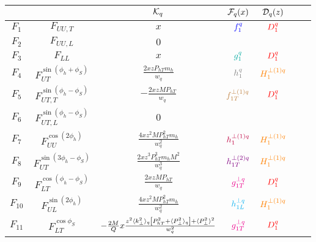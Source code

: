 \documentclass[floatfix,aps,prd,nofootinbib,superscriptaddress,preprint]{revtex4}
\newcommand\3[1]{\boldsymbol{#1}}
\newcommand{\Phperp}{P_{hT}}
\newcommand{\pperp}{P_\perp}
\newcommand{\avpperp}{\la \pperp^2 \ra}
\newcommand{\la}{\langle}
\newcommand{\ra}{\rangle}
\begin{document}
\begin{table}[h!]
\begin{tabular}{|c|c|c|c|c|c|c|}
\hline
         &                                     & ${\cal{K}}_q$                                                                               & ${\cal F}_q(x)$ & ${\cal D}_q(z)$ \\\hline
$F_1$    & $F_{UU,T}$                          & $x$                                                                                         & ${\color{blue} f_1^q}$          & ${\color{red} D_1^{q}} $          \\\hline
$F_2$    & $F_{UU,L}$                          & $0$                                                                                         &                 & \\\hline
$F_3$    & $F_{LL}$                            & $x$                                                                                         & $\ppdf$         & ${\color{red} D_1^{q}}$           \\\hline
$F_4$    & $F_{UT}^{\sin(\phi_h+\phi_S)}$      & $\frac{2 x z \Phperp  m_h}{w_q}$                                                            & $\transversity$ & ${\color{orange} H^{\perp(1)q}_{1} }$      \\\hline
$F_5$    & $F_{UT,T}^{\sin(\phi_h-\phi_S)}$    & $-\frac{2xzM \Phperp}{w_q}$                                                                 & ${\color{brown} f^{\perp(1)q}_{1T}}$       & ${\color{red} D_1^{q}}$           \\\hline
$F_6$    & $F_{UT,L}^{\sin(\phi_h-\phi_S)}$    & $0$                                                                                         &                 & \\\hline
$F_7$    & $F_{UU}^{\cos(2\phi_h)}$            & $\frac{4 x z^2 M \Phperp^2 m_h}{w_q^2} $                                                    & ${\color{purple} h^{\perp(1)q}_1 }$  & ${\color{orange} H^{\perp(1)q}_{1} } $     \\\hline
$F_8$    & $F_{UT}^{\sin(3\phi_h-\phi_S)}$     & $\frac{2 x z^3 \Phperp^3 m_h M^2}{w_q^3} $                                                 & ${\color{violet} h^{\perp(2)q}_{1T} }$ & ${\color{orange} H^{\perp(1)q}_{1} } $     \\\hline
$F_9$    & $F_{LT}^{\cos(\phi_h -\phi_S)}$     & $ \frac{2xzM\Phperp}{w_q} $                                                                 & ${\color{magenta} g^{\perp q}_{1T}}$          & ${\color{red} D_1^{q}}$           \\\hline
$F_{10}$ & $F_{UL}^{\sin(2\phi_h)}$            & $ \frac{4 xz^2M \Phperp^2 m_h}{w_q^2} $                                                     & ${\color{cyan}h^{\perp q}_{1L}}$          & ${\color{orange} H^{\perp(1)q}_{1} } $     \\\hline
$F_{11}$ & $F_{LT}^{\cos\phi_S}$               & $-\frac{2M}{Q} x\frac{z^2\avk \left[\Phperp^2+ \avp\right] + \avpperp^2}{ w_q^2}$           & ${\color{magenta} g^{\perp q}_{1T}}$          & ${\color{red} D_1^{q}}$           \\\hline

\end{tabular}
\end{table}
\end{document}
